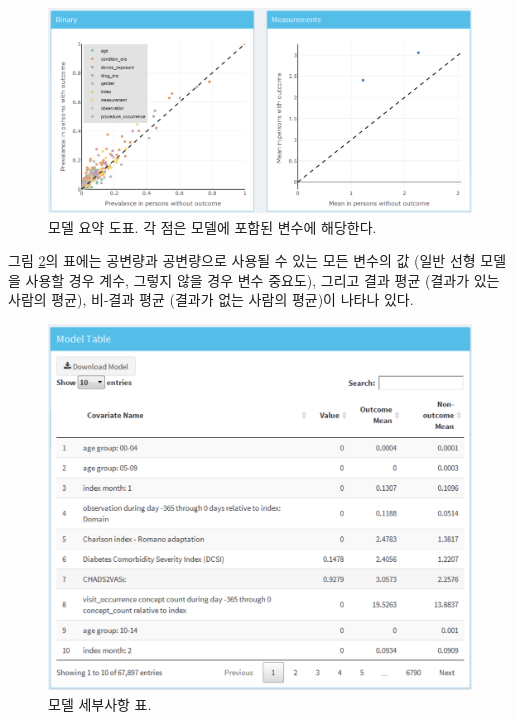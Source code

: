 \documentclass[10.5pt]{book}
\theoremstyle{definition}
\theoremstyle{definition}
\theoremstyle{definition}
\theoremstyle{remark}
\begin{document}
\begin{figure}

{\centering \includegraphics[width=1\linewidth]{images/PatientLevelPrediction/shiny/shinyModelPlots} 

}

\caption{모델 요약 도표. 각 점은 모델에 포함된 변수에 해당한다.}\label{fig:shinyModelPlots}
\end{figure}

그림 \ref{fig:shinyModelTable}의 표에는 공변량과 공변량으로 사용될 수
있는 모든 변수의 값 (일반 선형 모델을 사용할 경우 계수, 그렇지 않을 경우
변수 중요도), 그리고 결과 평균 (결과가 있는 사람의 평균), 비-결과 평균
(결과가 없는 사람의 평균)이 나타나 있다.

\begin{figure}

{\centering \includegraphics[width=1\linewidth]{images/PatientLevelPrediction/shiny/shinyModelTable} 

}

\caption{모델 세부사항 표.}\label{fig:shinyModelTable}
\end{figure}
\end{document}
